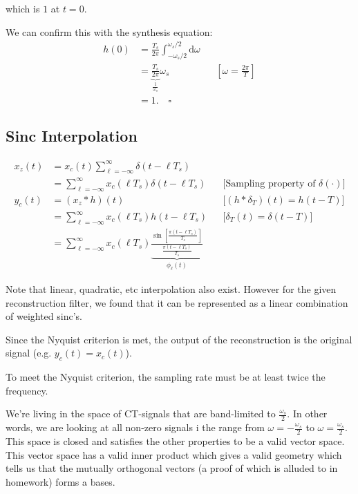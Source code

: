 which is $1$ at $t=0$.

We can confirm this with the synthesis equation:
\begin{align*}
    h(0) 
    &= \frac{T_s}{2\pi}\int_{-\omega_s/2}^{\omega_s/2}  \mathrm d \omega
    \\
    &= \underbrace{\frac{T_s}{2\pi}}_{\frac1{\omega_s}} \omega_s
    &&\left[\omega = \frac{2\pi}T\right]
    \\
    &= 1.\quad\square
\end{align*}

\hrulefill

\subsection{Sinc Interpolation}
\begin{align*}
    x_z(t) 
    &= x_c(t) \sum_{\ell=-\infty}^\infty \delta(t-\ell T_s)
    \\
    &=\sum_{\ell=-\infty}^\infty x_c(\ell T_s) \delta(t-\ell T_s)
    &&\text{[Sampling property of $\delta(\cdot)$]}
    \\
    y_c(t) 
    &= (x_z \ast h)(t)
    &&\text{[$(h\ast \delta_T)(t)=h(t-T)$]}
    \\
    &=\sum_{\ell=-\infty}^\infty x_c(\ell T_s) h(t-\ell T_s)
    &&\text{[$\delta_T(t)=\delta(t-T)$]}
    \\
    &=\sum_{\ell=-\infty}^\infty x_c(\ell T_s) 
    \underbrace{\frac{\sin\left[\frac{\pi(t-\ell T_s)}{T_s}\right]}{\frac{\pi(t-\ell T_s)}{T_s}}}_{\phi_\ell(t)}
\end{align*}

Note that linear, quadratic, etc interpolation also exist. However for the given reconstruction filter, we found that it can be represented as a linear combination of weighted sinc's.

Since the Nyquist criterion is met, the output of the reconstruction is the original signal (e.g. $y_c(t)=x_c(t)$).

To meet the Nyquist criterion, the sampling rate must be at least twice the frequency.

We're living in the space of CT-signals that are band-limited to $\frac{\omega_s}2$. In other words, we are looking at all non-zero signals i the range from $\omega=-\frac{\omega_s}{2}$ to $\omega=\frac{\omega_s}{2}$. This space is closed and satisfies the other properties to be a valid vector space. This vector space has a valid inner product which gives a valid geometry which tells us that the mutually orthogonal vectors (a proof of which is alluded to in homework) forms a bases.

